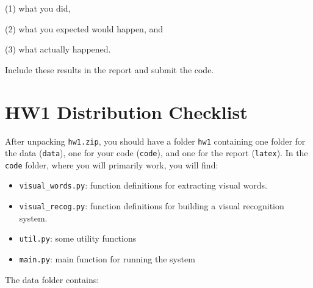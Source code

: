 \documentclass[11pt]{article}
\numberwithin{equation}{section} %
\numberwithin{figure}{section} %
\numberwithin{table}{section} %
\begin{document}
(1) what you did,
 
(2) what you expected would happen, and 

(3) what actually happened. 

Include these results in the report and submit the code.

\begin{your_solution}[title=Q3.2, height=16cm]
\end{your_solution}

\clearpage

\section{HW1 Distribution Checklist}
\label{sec:Manifest}
After unpacking {\tt hw1.zip}, you should have a folder {\tt hw1} containing
one folder for the data ({\tt data}), one for your code ({\tt code}), and one for the report ({\tt latex}).
In the {\tt code} folder, where you will primarily work, you will find:
\begin{itemize}
\item {\tt visual\_words.py}: function definitions for extracting visual words.
\item {\tt visual\_recog.py}: function definitions for building a visual recognition system.
\item {\tt util.py}: some utility functions
\item {\tt main.py}: main function for running the system

\end{itemize}

The data folder contains:
\end{document}
